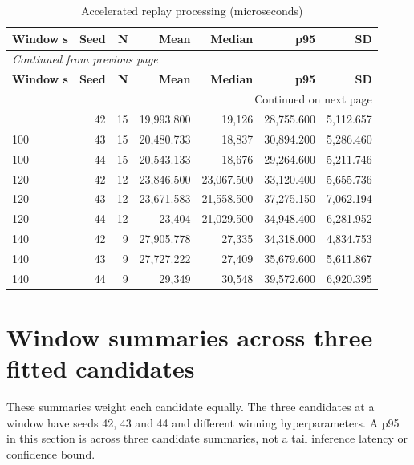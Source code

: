 \documentclass[10pt,a4paper]{article}
\begin{document}
\begin{longtable}{@{}lrrrrrr@{}}
\caption{Accelerated replay processing (microseconds)}\\
\toprule
\textbf{Window s} & \textbf{Seed} & \textbf{N} & \textbf{Mean} & \textbf{Median} & \textbf{p95} & \textbf{SD} \\
\midrule\endfirsthead
\multicolumn{7}{l}{\small\itshape Continued from previous page}\\
\toprule
\textbf{Window s} & \textbf{Seed} & \textbf{N} & \textbf{Mean} & \textbf{Median} & \textbf{p95} & \textbf{SD} \\
\midrule\endhead
\midrule\multicolumn{7}{r}{\small Continued on next page}\\\endfoot
\bottomrule\endlastfoot
100 & 42 & 15 & 19,993.800 & 19,126 & 28,755.600 & 5,112.657 \\
100 & 43 & 15 & 20,480.733 & 18,837 & 30,894.200 & 5,286.460 \\
100 & 44 & 15 & 20,543.133 & 18,676 & 29,264.600 & 5,211.746 \\
120 & 42 & 12 & 23,846.500 & 23,067.500 & 33,120.400 & 5,655.736 \\
120 & 43 & 12 & 23,671.583 & 21,558.500 & 37,275.150 & 7,062.194 \\
120 & 44 & 12 & 23,404 & 21,029.500 & 34,948.400 & 6,281.952 \\
140 & 42 & 9 & 27,905.778 & 27,335 & 34,318.000 & 4,834.753 \\
140 & 43 & 9 & 27,727.222 & 27,409 & 35,679.600 & 5,611.867 \\
140 & 44 & 9 & 29,349 & 30,548 & 39,572.600 & 6,920.395 \\
\end{longtable}\endgroup
\section{Window summaries across three fitted candidates}
These summaries weight each candidate equally. The three candidates at a window have seeds 42, 43 and 44 and different winning hyperparameters. A p95 in this section is across three candidate summaries, not a tail inference latency or confidence bound.
\end{document}
